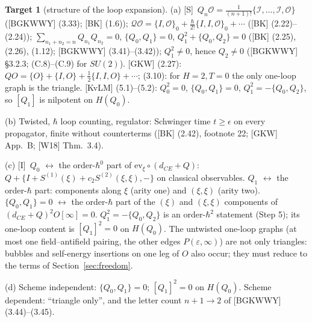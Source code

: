 \documentclass[11pt]{article}
\theoremstyle{definition}
\newtheorem{target}{Target}
\newcommand{\Sl}{\textup{[S]}}
\newcommand{\Il}{\textup{[I]}}
\begin{document}
\begin{target}[structure of the loop expansion]\label{t:structure}
(a) \Sl\ $Q_n\mathcal O=\frac1{(n+1)!}\{\mathcal I,\dots,\mathcal I,\mathcal O\}$ ([BGKWWY] (3.33); [BK] (1.6)); $\mathcal Q\mathcal O=\{I,\mathcal O\}_0+\frac{\hbar}{2!}\{I,I,\mathcal O\}_0+\cdots$ ([BK] (2.22)--(2.24)); $\sum_{n_1+n_2=n}Q_{n_1}Q_{n_2}=0$, $\{Q_0,Q_1\}=0$, $Q_1^2+\{Q_0,Q_2\}=0$ ([BK] (2.25), (2.26), (1.12); [BGKWWY] (3.41)--(3.42)); $Q_1^2\neq0$, hence $Q_2\neq0$ ([BGKWWY] \S3.2.3; (C.8)--(C.9) for $SU(2)$). [GKW] (2.27): $QO=\{O\}+\{I,O\}+\frac12\{I,I,O\}+\cdots$; (3.10): for $H=2,T=0$ the only one-loop graph is the triangle. [KvLM] (5.1)--(5.2): $Q_0^2=0$, $\{Q_0,Q_1\}=0$, $Q_1^2=-\{Q_0,Q_2\}$, so $[Q_1]$ is nilpotent on $H(Q_0)$.

(b) Twisted, $\hbar$ loop counting, regulator: Schwinger time $t\ge\epsilon$ on every propagator, finite without counterterms ([BK] (2.42), footnote 22; [GKW] App.~B; [W18] Thm.~3.4).

(c) \Il\ $Q_0$ $\leftrightarrow$ the order-$\hbar^0$ part of $\mathrm{ev}_\xi\circ(d_{CE}+Q)$: $Q+\{I+S^{(1)}(\xi)+c_2S^{(2)}(\xi,\xi),-\}$ on classical observables. $Q_1$ $\leftrightarrow$ the order-$\hbar$ part: components along $\xi$ (arity one) and $(\xi,\xi)$ (arity two). $\{Q_0,Q_1\}=0$ $\leftrightarrow$ the order-$\hbar$ part of the $(\xi)$ and $(\xi,\xi)$ components of $(d_{CE}+Q)^2O[\infty]=0$. $Q_1^2=-\{Q_0,Q_2\}$ is an order-$\hbar^2$ statement (Step 5); its one-loop content is $[Q_1]^2=0$ on $H(Q_0)$. The untwisted one-loop graphs (at most one field--antifield pairing, the other edges $P(\varepsilon,\infty)$) are not only triangles: bubbles and self-energy insertions on one leg of $O$ also occur; they must reduce to the terms of Section~\ref{sec:freedom}.

(d) Scheme independent: $\{Q_0,Q_1\}=0$; $[Q_1]^2=0$ on $H(Q_0)$. Scheme dependent: ``triangle only'', and the letter count $n+1\to2$ of [BGKWWY] (3.44)--(3.45).
\end{target}
\end{document}
